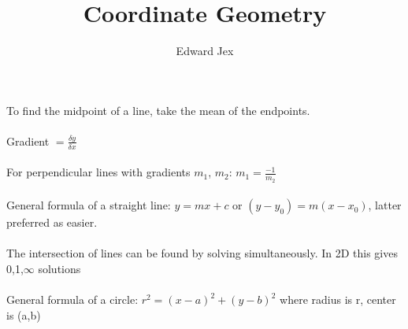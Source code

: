 \documentclass[a4paper,12pt]{article}
\begin{document}
\title{Coordinate Geometry}	
\author{Edward Jex}
\maketitle
To find the midpoint of a line, take the mean of the endpoints.\\\\
Gradient $= \frac{\delta y}{\delta x}$\\\\
For perpendicular lines with gradients $m_1$, $m_2$: $m_1 = \frac{-1}{m_2}$\\\\
General formula of a straight line: $y = mx + c$ or $(y-y_0)=m(x-x_0)$, latter preferred as easier.\\\\
The intersection of lines can be found by solving simultaneously. In 2D this gives 0,1,$\infty$ solutions\\\\
General formula of a circle: $r^2 = (x-a)^2 + (y-b)^2$ where radius is r, center is (a,b)\\\\
\end{document}
